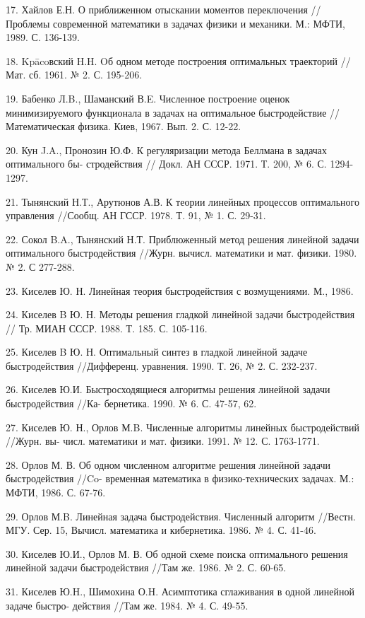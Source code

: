 \documentclass[10pt]{article}
\begin{document}
17. Хайлов Е.Н. О приближенном отыскании моментов переключения //Проблемы современной математики в задачах физики и механики. М.: МФТИ, 1989. С. 136-139.

18. Kpācoвский H.H. Oб одном методе построения оптимальных траекторий //Мат. сб. 1961. № 2. С. 195-206.

19. Бабенко Л.B., Шаманский В.E. Численное построение оценок минимизируемого функционала в задачах на оптимальное быстродействие //Математическая физика. Киев, 1967. Вып. 2. С. 12-22.

20. Кун J.A., Пронозин Ю.Ф. К регуляризации метода Беллмана в задачах оптимального бы- стродействия // Докл. АН СССР. 1971. Т. 200, № 6. С. 1294-1297.

21. Тынянский Н.Т., Арутюнов А.В. К теории линейных процессов оптимального управления //Сообщ. АН ГССР. 1978. Т. 91, № 1. С. 29-31.

22. Сокол B.A., Тынянский Н.Т. Приблюженный метод решения линейной задачи оптимального быстродействия //Журн. вычисл. математики и мат. физики. 1980. № 2. С 277-288.

23. Киселев Ю. Н. Линейная теория быстродействия с возмущениями. М., 1986.

24. Киселев B Ю. Н. Методы решения гладкой линейной задачи быстродействия // Тр. МИАН СССР. 1988. Т. 185. С. 105-116.

25. Киселев B Ю. Н. Оптимальный синтез в гладкой линейной задаче быстродействия //Дифференц. уравнения. 1990. Т. 26, № 2. С. 232-237.

26. Киселев Ю.И. Быстросходящиеся алгоритмы решения линейной задачи быстродействия //Ка- бернетика. 1990. № 6. С. 47-57, 62.

27. Киселев Ю. Н., Орлов М.B. Численные алгоритмы линейных быстродействий //Журн. вы- числ. математики и мат. физики. 1991. № 12. С. 1763-1771.

28. Орлов М. В. Об одном численном алгоритме решения линейной задачи быстродействия //Co- временная математика в физико-технических задачах. М.: МФТИ, 1986. С. 67-76.

29. Орлов М.B. Линейная задача быстродействия. Численный алгоритм //Вестн. МГУ. Сер. 15, Вычисл. математика и кибернетика. 1986. № 4. С. 41-46.

30. Киселев Ю.И., Орлов М. В. Об одной схеме поиска оптимального решения линейной задачи быстродействия //Там же. 1986. № 2. С. 60-65.

31. Киселев Ю.H., Шимохина О.H. Асимптотика сглаживания в одной линейной задаче быстро- действия //Там же. 1984. № 4. С. 49-55.
\end{document}
